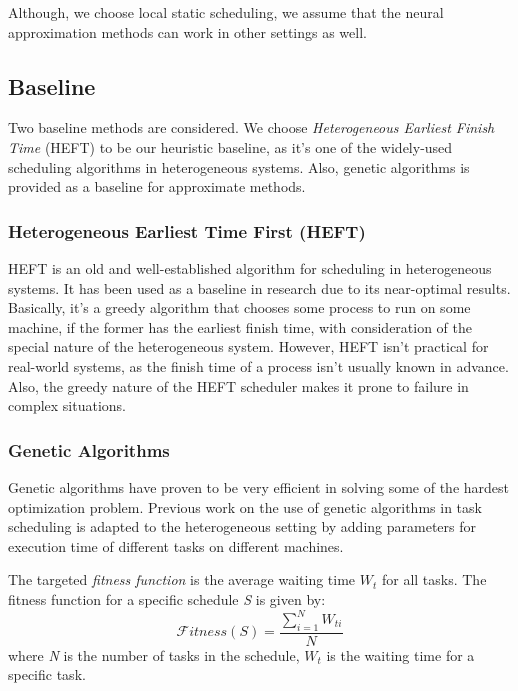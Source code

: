 Although, we choose local static scheduling, we assume that the neural approximation methods can work in other settings as well.

\subsection{Baseline}
Two baseline methods are considered. We choose \emph{Heterogeneous Earliest Finish Time} (HEFT) \cite{993206} to be our heuristic baseline, as it's one of the widely-used scheduling algorithms in heterogeneous systems. Also, genetic algorithms \cite{article2} is provided as a baseline for approximate methods. \\

\subsubsection{Heterogeneous Earliest Time First (HEFT)}
HEFT \cite{993206} is an old and well-established algorithm for scheduling in heterogeneous systems. It has been used as a baseline in research due to its near-optimal results. Basically, it's a greedy algorithm that chooses some process to run on some machine, if the former has the earliest finish time, with consideration of the special nature of the heterogeneous system. However, HEFT isn't practical for real-world systems, as the finish time of a process isn't usually known in advance. Also, the greedy nature of the HEFT scheduler makes it prone to failure in complex situations. \\

\subsubsection{Genetic Algorithms}
Genetic algorithms \cite{article2} have proven to be very efficient in solving some of the hardest optimization problem. Previous work on the use of genetic algorithms in task scheduling \cite{article2} is adapted to the heterogeneous setting by adding parameters for execution time of different tasks on different machines.

The targeted \emph{fitness function} is the average waiting time $W_t$ for all tasks. The fitness function for a specific schedule \emph{S} is given by:
\begin{equation}
\mathcal Fitness(S) = \frac{\sum_{i=1}^{N} W_{ti}}{N} \label{eq:ga}
\end{equation}
where \emph{N} is the number of tasks in the schedule, $W_t$ is the waiting time for a specific task.

